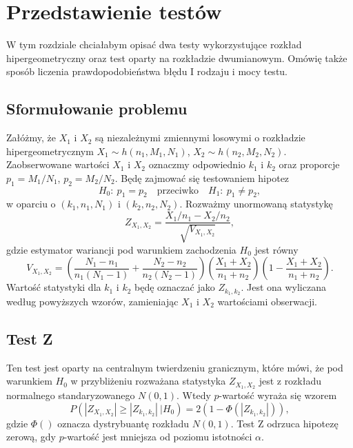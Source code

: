 \chapter{Przedstawienie testów}

W tym rozdziale chciałabym opisać dwa testy wykorzystujące rozkład hipergeometryczny oraz test oparty na rozkładzie dwumianowym. Omówię także sposób liczenia prawdopodobieństwa błędu I rodzaju i mocy testu.

\section{Sformułowanie problemu}
Załóżmy, że $X_1$ i $X_2$ są niezależnymi zmiennymi losowymi o rozkładzie hipergeometrycznym $X_1\sim h(n_1,M_1,N_1)$, $X_2\sim h(n_2,M_2,N_2)$. Zaobserwowane wartości $X_1$ i $X_2$ oznaczmy odpowiednio $k_1$ i $k_2$ oraz proporcje $p_1=M_1/N_1$, $p_2=M_2/N_2$. Będę zajmować się testowaniem hipotez
\begin{equation}
H_0{:}\ p_1=p_2\quad \text{przeciwko} \quad H_1{:}\ p_1\neq p_2,
\end{equation}
w oparciu o $(k_1,n_1,N_1)$ i $(k_2,n_2,N_2)$.
Rozważmy unormowaną statystykę
\begin{equation}
Z_{X_1,X_2} = \frac{X_1/n_1-X_2/n_2}{\sqrt{V_{X_1,X_2}}},
\end{equation}
gdzie estymator wariancji pod warunkiem zachodzenia $H_0$ jest równy
\begin{equation}
V_{X_1,X_2} = \left(\frac{N_1-n_1}{n_1(N_1-1)}+\frac{N_2-n_2}{n_2(N_2-1)}\right)\left(\frac{X_1+X_2}{n_1+n_2}\right)\left(1-\frac{X_1+X_2}{n_1+n_2}\right).
\end{equation}
Wartość statystyki dla $k_1$ i $k_2$ będę oznaczać jako $Z_{k_1,k_2}$. Jest ona wyliczana według powyższych wzorów, zamieniając $X_1$ i $X_2$ wartościami obserwacji.

\section{Test Z}
Ten test jest oparty na centralnym twierdzeniu granicznym, które mówi, że pod warunkiem $H_0$ w przybliżeniu rozważana statystyka $Z_{X_1,X_2}$ jest z rozkładu normalnego standaryzowanego $N(0,1)$. Wtedy $p$-wartość wyraża się wzorem
\begin{equation}
P(|Z_{X_1,X_2}|\geq|Z_{k_1,k_2}|\ |H_0) = 2(1-\Phi(|Z_{k_1,k_2}|)),
\end{equation}
gdzie $\Phi()$ oznacza dystrybuantę rozkładu $N(0,1)$. Test Z odrzuca hipotezę zerową, gdy $p$-wartość jest mniejsza od poziomu istotności $\alpha$.

